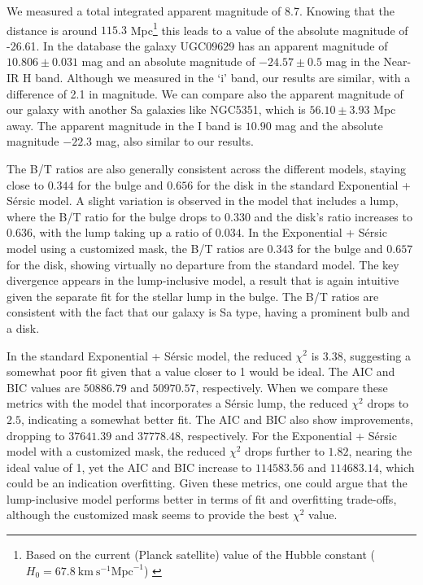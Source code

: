 We measured a total integrated apparent magnitude of 8.7. Knowing that the distance is around $115.3$ Mpc\footnote{Based on the current (Planck satellite) value of the Hubble constant ($H_0=67.8 \ \text{km} \ \text{s}^{-1} \text{Mpc}^{-1}$) \citep{aghanim2020planck}}
this leads to a value of the absolute magnitude of -26.61. In the database \citep{ned} the galaxy UGC09629 has an apparent 
magnitude of \(10.806 \pm 0.031\) mag and an absolute magnitude of \(-24.57 \pm 0.5\) mag in the Near-IR H band. 
Although we measured in the `i' band, our results are similar, with a difference of 2.1 in magnitude. We can compare also the apparent magnitude of our galaxy with another Sa galaxies like NGC5351, which is \(56.10 \pm 3.93\) Mpc away. The apparent magnitude in the I band is \(10.90\) mag and the absolute magnitude \(-22.3\) mag, also similar to our results. 

The B/T ratios are also generally consistent across the different models, staying close to \(0.344\) for the bulge and \(0.656\) for the disk in the standard Exponential + Sérsic model. A slight variation is observed in the model that includes a lump, where the B/T ratio for the bulge drops to \(0.330\) and the disk's ratio increases to \(0.636\), with the lump taking up a ratio of \(0.034\). In the Exponential + Sérsic model using a customized mask, the B/T ratios are \(0.343\) for the bulge and \(0.657\) for the disk, showing virtually no departure from the standard model. The key divergence appears in the lump-inclusive model, a result that is again intuitive given the separate fit for the stellar lump in the bulge. The B/T ratios are consistent with the fact that our galaxy is Sa type, having a prominent bulb and a disk. 

In the standard Exponential + Sérsic model, the reduced \(\chi^{2}\) is \(3.38\), suggesting a somewhat poor fit given that a value closer to 1 would be ideal. The AIC and BIC values are \(50886.79\) and \(50970.57\), respectively. When we compare these metrics with the model that incorporates a Sérsic lump, the reduced \(\chi^{2}\) drops to \(2.5\), indicating a somewhat better fit. The AIC and BIC also show improvements, dropping to \(37641.39\) and \(37778.48\), respectively. For the Exponential + Sérsic model with a customized mask, the reduced \(\chi^{2}\) drops further to \(1.82\), nearing the ideal value of 1, yet the AIC and BIC increase to \(114583.56\) and \(114683.14\), which could be an indication overfitting. Given these metrics, one could argue that the lump-inclusive model performs better in terms of fit and overfitting trade-offs, although the customized mask seems to provide the best \(\chi^{2}\) value. 

